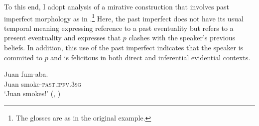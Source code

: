 \documentclass[output=paper]{langscibook}
\begin{document}
%
%
%

To this end, I adopt  analysis of a  mirative construction that involves past imperfect morphology as in .\footnote{The glosses are as in the original example.} Here, the past imperfect does not have its usual temporal meaning expressing reference to a past eventuality but refers to a present eventuality and expresses that $p$ clashes with the speaker's previous beliefs. In addition, this use of the past imperfect indicates that the speaker is commited to $p$ and is felicitous in both direct and inferential evidential contexts.


\ea\label{ex:fumaba}
\gll Juan fum-aba. \hfill \\
Juan smoke-\textsc{past.ipfv.3sg}\\
\glt `Juan smokes!' \hfill (, \citealt[34]{Bustamante2013})\\
\z

%
%
\end{document}
